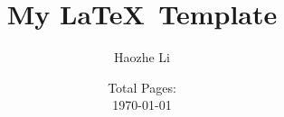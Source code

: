 \documentclass[11pt,fleqn]{article}
\begin{document}
\begin{titlepage}
	\title{\textbf{My \LaTeX \, Template}}
	\author{Haozhe Li}
	\date{
		Total Pages: \pageref{LastPage}\\[2ex]
		\today}
	\maketitle
	\setcounter{page}{0}
	\thispagestyle{empty}
\end{titlepage}
\pagebreak \newpage
\clearpage
\newpage
\pagestyle{fancy}
\newpage
\pagestyle{fancy}
\end{document}
